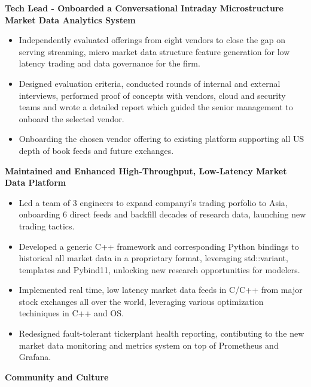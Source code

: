 \begin{cventries}
{\begin{cvitems}
\begin{itemize}
          \end{itemize}
        \item {\fontsize{10pt}{1em}\bodyfont\bfseries\color{darktext}Tech Lead - Onboarded a Conversational Intraday Microstructure Market Data Analytics System}
          \begin{itemize}
            \item {Independently evaluated offerings from eight vendors to close the gap on serving streaming, micro market data structure feature generation for low latency trading and data governance for the firm.}
            \item {Designed evaluation criteria, conducted rounds of internal and external interviews, performed proof of concepts with vendors, cloud and security teams and wrote a detailed report which guided the senior management to onboard the selected vendor.}
            \item {Onboarding the chosen vendor offering to existing platform supporting all US depth of book feeds and future exchanges.}
          \end{itemize}
        \item {\fontsize{10pt}{1em}\bodyfont\bfseries\color{darktext} Maintained and Enhanced High-Throughput, Low-Latency Market Data Platform}
          \begin{itemize}
              \item {Led a team of 3 engineers to expand companyi's trading porfolio to Asia, onboarding 6 direct feeds and backfill decades of research data, launching new trading tactics.}
              \item {Developed a generic C++ framework and corresponding Python bindings to historical all market data in a proprietary format, leveraging std::variant, templates and Pybind11, unlocking new research opportunities for modelers.}
              \item {Implemented real time, low latency market data feeds in C/C++ from major stock exchanges all over the world, leveraging various optimization techiniques in C++ and OS.}
              \item {Redesigned fault-tolerant tickerplant health reporting, contibuting to the new market data monitoring and metrics system on top of Prometheus and Grafana.}
          \end{itemize}
      \item {\fontsize{10pt}{1em}\bodyfont\bfseries\color{darktext}Community and Culture}
          \begin{itemize}

\end{itemize}
\end{cvitems}}
\end{cventries}
